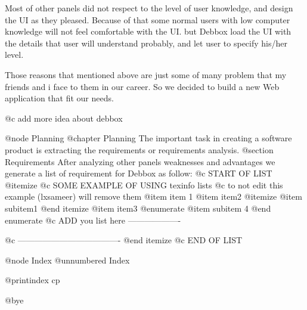 Most of other panels did not respect to the level of user knowledge, and design the UI as they pleased. Because of that
some normal users with low computer knowledge will not feel comfortable with the UI. but Debbox load the UI with the details
 that user will understand probably, and let user to specify his/her level.

Those reasons that mentioned above are just some of many problem that my friends and i face to them in our career. So
we decided to build a new Web application that fit our needs.


@c add more idea about debbox       

@node Planning
@chapter Planning
The important task in creating a software product is extracting the requirements or requirements analysis. 
@section Requirements
After analyzing other panels weaknesses and advantages we generate a list of requirement for Debbox as follow:
@c START OF LIST
@itemize
@c SOME EXAMPLE OF USING texinfo lists
@c to not edit this example (lxsameer) will remove them
@item
item 1
@item
item2
@itemize
@item 
subitem1
@end itemize
@item
item3
@enumerate 
@item
subitem 4
@end enumerate
@c ADD you list here -------------------

@c -------------------------------------
@end itemize
@c END OF LIST

@node Index
@unnumbered Index

@printindex cp

@bye

